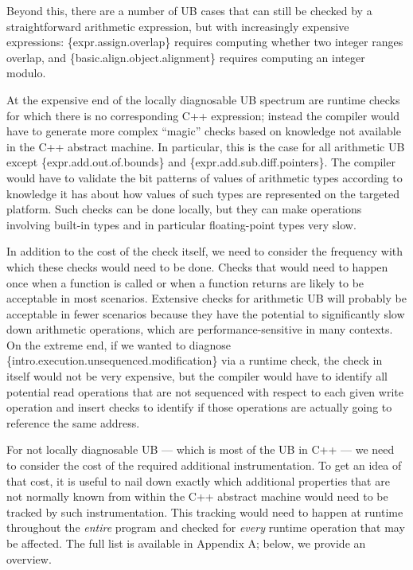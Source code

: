 Beyond this, there are a number of UB cases that can still be checked by a straightforward arithmetic expression, but with increasingly expensive expressions: \{expr.assign.overlap\} requires computing whether two integer ranges overlap, and  \{basic.align.object.alignment\} requires computing an integer modulo. 

At the expensive end of the locally diagnosable UB spectrum are runtime checks for which there is no corresponding C++ expression; instead the compiler would have to generate more complex ``magic'' checks based on knowledge not available in the C++ abstract machine. In particular, this is the case for all arithmetic UB except \{expr.add.out.of.bounds\} and
\{expr.add.sub.diff.pointers\}. The compiler would have to validate the bit patterns of values of arithmetic types according to knowledge it has about how values of such types are represented on the targeted platform. Such checks can be done locally, but they can make operations involving built-in types and in particular floating-point types very slow.

In addition to the cost of the check itself, we need to consider the frequency with which these checks would need to be done. Checks that would need to happen once when a function is called or when a function returns are likely to be acceptable in most scenarios. Extensive checks for arithmetic UB will probably be acceptable in fewer scenarios because they have the potential to significantly slow down arithmetic operations, which are performance-sensitive in many contexts. On the extreme end, if we wanted to diagnose \{intro.execution.unsequenced.modification\} via a runtime check, the check in itself would not be very expensive, but the compiler would have to identify all potential read operations that are not sequenced with respect to each given write operation and insert checks to identify if those operations are actually going to reference the same address.

For not locally diagnosable UB --- which is most of the UB in C++ --- we need to consider the cost of the required additional instrumentation. To get an idea of that cost, it is useful to nail down exactly which additional properties that are not normally known from within the C++ abstract machine would need to be tracked by such instrumentation. This tracking would need to happen at runtime throughout the \emph{entire} program and checked for \emph{every} runtime operation that may be affected. The full list is available in Appendix A; below, we provide an overview.

